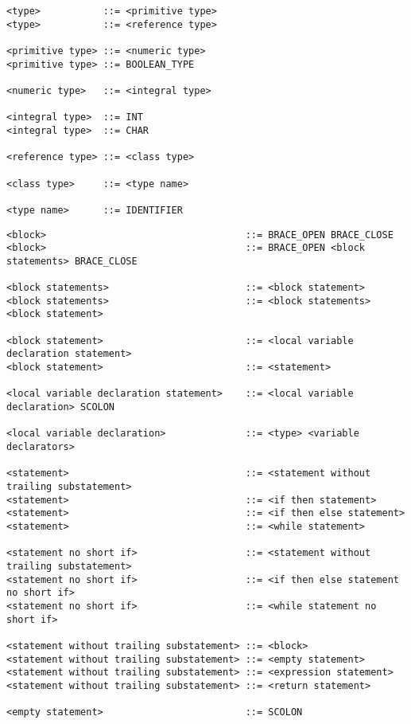 \begin{lstlisting}
<type>           ::= <primitive type>
<type>           ::= <reference type>

<primitive type> ::= <numeric type>
<primitive type> ::= BOOLEAN_TYPE

<numeric type>   ::= <integral type>

<integral type>  ::= INT
<integral type>  ::= CHAR

<reference type> ::= <class type>

<class type>     ::= <type name>

<type name>      ::= IDENTIFIER
\end{lstlisting}

\begin{lstlisting}
<block>                                   ::= BRACE_OPEN BRACE_CLOSE
<block>                                   ::= BRACE_OPEN <block statements> BRACE_CLOSE

<block statements>                        ::= <block statement>
<block statements>                        ::= <block statements> <block statement>

<block statement>                         ::= <local variable declaration statement>
<block statement>                         ::= <statement>

<local variable declaration statement>    ::= <local variable declaration> SCOLON

<local variable declaration>              ::= <type> <variable declarators>

<statement>                               ::= <statement without trailing substatement>
<statement>                               ::= <if then statement>
<statement>                               ::= <if then else statement>
<statement>                               ::= <while statement>

<statement no short if>                   ::= <statement without trailing substatement>
<statement no short if>                   ::= <if then else statement no short if>
<statement no short if>                   ::= <while statement no short if>

<statement without trailing substatement> ::= <block>
<statement without trailing substatement> ::= <empty statement>
<statement without trailing substatement> ::= <expression statement>
<statement without trailing substatement> ::= <return statement>

<empty statement>                         ::= SCOLON


\end{lstlisting}
